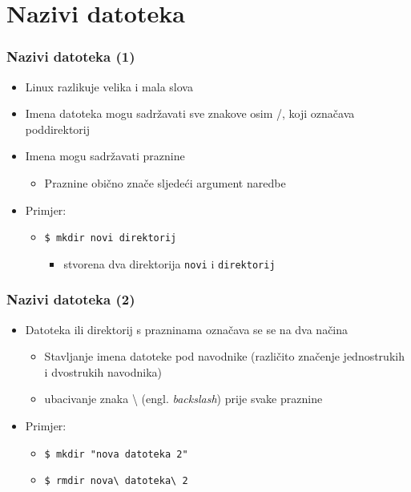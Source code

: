 \documentclass{beamer}
\begin{document}
\section{Nazivi datoteka}
\begin{frame}[t]
\frametitle{Nazivi datoteka (1)}
\begin{itemize}
  \item Linux razlikuje velika i mala slova
  \item Imena datoteka mogu sadržavati sve znakove osim /, koji označava
        poddirektorij
  \item Imena mogu sadržavati praznine
  \begin{itemize}
    \item Praznine obično znače sljedeći argument naredbe
  \end{itemize}
  \item Primjer:
  \begin{itemize}
    \item[] \texttt{\$ mkdir novi direktorij}
    \begin{itemize}
    	\item stvorena dva direktorija \texttt{novi} i \texttt{direktorij}
    \end{itemize}
  \end{itemize}
\end{itemize}
\end{frame}

\begin{frame}[t]
\frametitle{Nazivi datoteka (2)}
\begin{itemize}
  \item Datoteka ili direktorij s prazninama označava se se na dva načina
  \begin{itemize}
  \item Stavljanje imena datoteke pod navodnike (različito značenje jednostrukih i dvostrukih navodnika)
    \item ubacivanje znaka \textbackslash{} (engl. \emph{backslash})
          prije svake praznine
  \end{itemize}
  \item Primjer:
  \begin{itemize}
    \item[] \texttt{\$ mkdir "nova datoteka 2"}
    \item[] \texttt{\$ rmdir nova\textbackslash{} datoteka\textbackslash{}
                     2}
  \end{itemize}
\end{itemize}
\end{frame}
\end{document}
